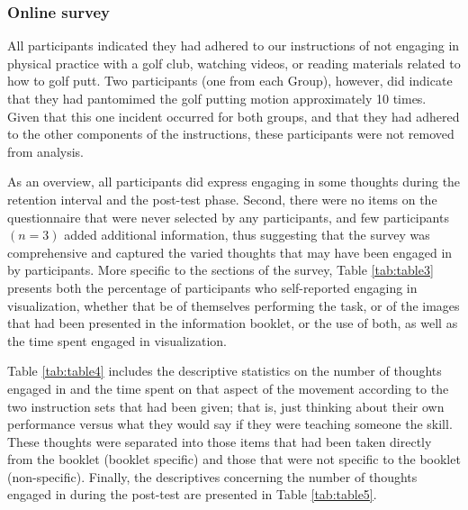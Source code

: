 \documentclass[
  english,
  man,floatsintext]{apa7}
\begin{document}
\hypertarget{online-survey}{%
\subsubsection{Online survey}\label{online-survey}}

All participants indicated they had adhered to our instructions of not engaging in physical practice with a golf club, watching videos, or reading materials related to how to golf putt. Two participants (one from each Group), however, did indicate that they had pantomimed the golf putting motion approximately 10 times. Given that this one incident occurred for both groups, and that they had adhered to the other components of the instructions, these participants were not removed from analysis.

As an overview, all participants did express engaging in some thoughts during the retention interval and the post-test phase. Second, there were no items on the questionnaire that were never selected by any participants, and few participants \((n = 3)\) added additional information, thus suggesting that the survey was comprehensive and captured the varied thoughts that may have been engaged in by participants. More specific to the sections of the survey, Table \ref{tab:table3} presents both the percentage of participants who self-reported engaging in visualization, whether that be of themselves performing the task, or of the images that had been presented in the information booklet, or the use of both, as well as the time spent engaged in visualization.

Table \ref{tab:table4} includes the descriptive statistics on the number of thoughts engaged in and the time spent on that aspect of the movement according to the two instruction sets that had been given; that is, just thinking about their own performance versus what they would say if they were teaching someone the skill. These thoughts were separated into those items that had been taken directly from the booklet (booklet specific) and those that were not specific to the booklet (non-specific). Finally, the descriptives concerning the number of thoughts engaged in during the post-test are presented in Table \ref{tab:table5}.
\end{document}
